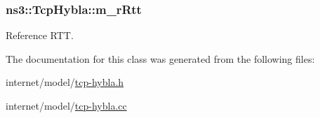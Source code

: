 \subsubsection[{\texorpdfstring{m\+\_\+r\+Rtt}{m_rRtt}}]{ ns3\+::\+Tcp\+Hybla\+::m\+\_\+r\+Rtt\hspace{0.3cm}{\ttfamily [private]}}\hypertarget{classns3_1_1TcpHybla_a3bde103cdd139def963021b423853d78}{}\label{classns3_1_1TcpHybla_a3bde103cdd139def963021b423853d78}


Reference R\+TT. 



The documentation for this class was generated from the following files\+:\begin{DoxyCompactItemize}
\item 
internet/model/\hyperlink{tcp-hybla_8h}{tcp-\/hybla.\+h}\item 
internet/model/\hyperlink{tcp-hybla_8cc}{tcp-\/hybla.\+cc}\end{DoxyCompactItemize}
